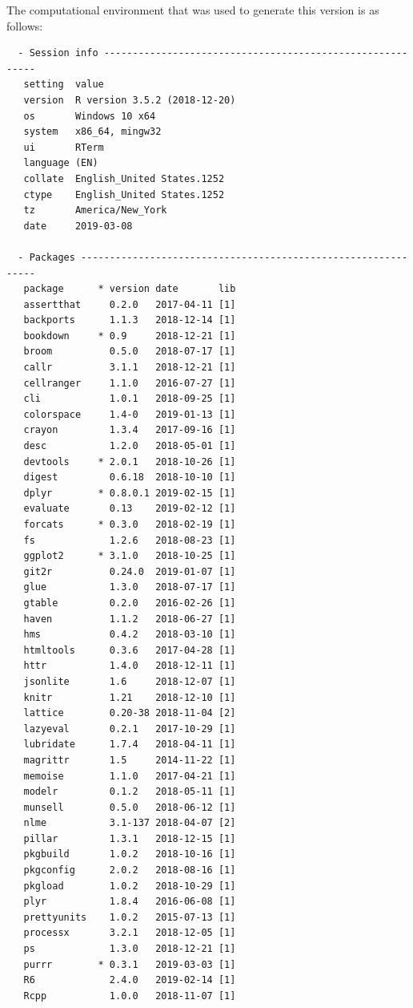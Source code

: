 \documentclass[ms]{uncgdissertationexp}
\theoremstyle{plain}
\theoremstyle{definition}
\theoremstyle{remark}
\begin{document}
  The computational environment that was used to generate this version is
  as follows:
  \begin{verbatim}
  - Session info ----------------------------------------------------------
   setting  value                       
   version  R version 3.5.2 (2018-12-20)
   os       Windows 10 x64              
   system   x86_64, mingw32             
   ui       RTerm                       
   language (EN)                        
   collate  English_United States.1252  
   ctype    English_United States.1252  
   tz       America/New_York            
   date     2019-03-08                  
  
  - Packages --------------------------------------------------------------
   package      * version date       lib
   assertthat     0.2.0   2017-04-11 [1]
   backports      1.1.3   2018-12-14 [1]
   bookdown     * 0.9     2018-12-21 [1]
   broom          0.5.0   2018-07-17 [1]
   callr          3.1.1   2018-12-21 [1]
   cellranger     1.1.0   2016-07-27 [1]
   cli            1.0.1   2018-09-25 [1]
   colorspace     1.4-0   2019-01-13 [1]
   crayon         1.3.4   2017-09-16 [1]
   desc           1.2.0   2018-05-01 [1]
   devtools     * 2.0.1   2018-10-26 [1]
   digest         0.6.18  2018-10-10 [1]
   dplyr        * 0.8.0.1 2019-02-15 [1]
   evaluate       0.13    2019-02-12 [1]
   forcats      * 0.3.0   2018-02-19 [1]
   fs             1.2.6   2018-08-23 [1]
   ggplot2      * 3.1.0   2018-10-25 [1]
   git2r          0.24.0  2019-01-07 [1]
   glue           1.3.0   2018-07-17 [1]
   gtable         0.2.0   2016-02-26 [1]
   haven          1.1.2   2018-06-27 [1]
   hms            0.4.2   2018-03-10 [1]
   htmltools      0.3.6   2017-04-28 [1]
   httr           1.4.0   2018-12-11 [1]
   jsonlite       1.6     2018-12-07 [1]
   knitr          1.21    2018-12-10 [1]
   lattice        0.20-38 2018-11-04 [2]
   lazyeval       0.2.1   2017-10-29 [1]
   lubridate      1.7.4   2018-04-11 [1]
   magrittr       1.5     2014-11-22 [1]
   memoise        1.1.0   2017-04-21 [1]
   modelr         0.1.2   2018-05-11 [1]
   munsell        0.5.0   2018-06-12 [1]
   nlme           3.1-137 2018-04-07 [2]
   pillar         1.3.1   2018-12-15 [1]
   pkgbuild       1.0.2   2018-10-16 [1]
   pkgconfig      2.0.2   2018-08-16 [1]
   pkgload        1.0.2   2018-10-29 [1]
   plyr           1.8.4   2016-06-08 [1]
   prettyunits    1.0.2   2015-07-13 [1]
   processx       3.2.1   2018-12-05 [1]
   ps             1.3.0   2018-12-21 [1]
   purrr        * 0.3.1   2019-03-03 [1]
   R6             2.4.0   2019-02-14 [1]
   Rcpp           1.0.0   2018-11-07 [1]

\end{verbatim}
\end{document}
